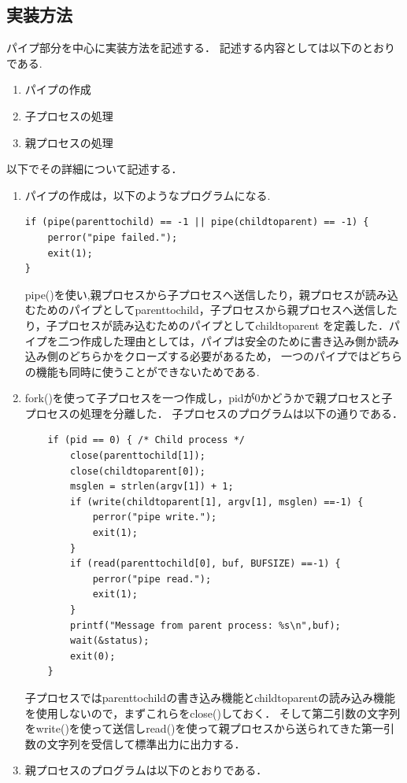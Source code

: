 \documentclass[dvipdfmx]{jarticle}
\begin{document}
\subsection{実装方法}
パイプ部分を中心に実装方法を記述する．
記述する内容としては以下のとおりである.
\begin{enumerate}
    \item パイプの作成
    \item 子プロセスの処理
    \item 親プロセスの処理
\end{enumerate}
以下でその詳細について記述する．
\begin{enumerate}
    \item パイプの作成は，以下のようなプログラムになる.
    \begin{lstlisting}
if (pipe(parenttochild) == -1 || pipe(childtoparent) == -1) {
    perror("pipe failed.");
    exit(1);
}
    \end{lstlisting}
    pipe()を使い,親プロセスから子プロセスへ送信したり，親プロセスが読み込むためのパイプとしてparenttochild，子プロセスから親プロセスへ送信したり，子プロセスが読み込むためのパイプとしてchildtoparent
    を定義した．パイプを二つ作成した理由としては，パイプは安全のために書き込み側か読み込み側のどちらかをクローズする必要があるため，
    一つのパイプではどちらの機能も同時に使うことができないためである.
    \item fork()を使って子プロセスを一つ作成し，pidが0かどうかで親プロセスと子プロセスの処理を分離した．
    子プロセスのプログラムは以下の通りである．
    \begin{lstlisting}
    if (pid == 0) { /* Child process */
        close(parenttochild[1]);
        close(childtoparent[0]);
        msglen = strlen(argv[1]) + 1;
        if (write(childtoparent[1], argv[1], msglen) ==-1) {
            perror("pipe write.");
            exit(1);
        }
        if (read(parenttochild[0], buf, BUFSIZE) ==-1) {
            perror("pipe read.");
            exit(1);
        }
        printf("Message from parent process: %s\n",buf);
        wait(&status);
        exit(0);
    }
    \end{lstlisting}
    子プロセスではparenttochildの書き込み機能とchildtoparentの読み込み機能を使用しないので，まずこれらをclose()しておく．
    そして第二引数の文字列をwrite()を使って送信しread()を使って親プロセスから送られてきた第一引数の文字列を受信して標準出力に出力する．
    \item 親プロセスのプログラムは以下のとおりである．
    \begin{lstlisting}

\end{lstlisting}
\end{enumerate}
\end{document}
